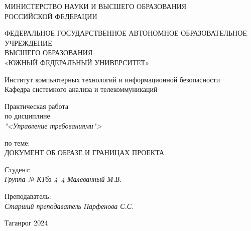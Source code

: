\thispagestyle{empty}

\begin{center}
    МИНИСТЕРСТВО НАУКИ И ВЫСШЕГО ОБРАЗОВАНИЯ \\ РОССИЙСКОЙ ФЕДЕРАЦИИ

    \vspace{20pt}

    ФЕДЕРАЛЬНОЕ ГОСУДАРСТВЕННОЕ АВТОНОМНОЕ ОБРАЗОВАТЕЛЬНОЕ УЧРЕЖДЕНИЕ \\
    ВЫСШЕГО ОБРАЗОВАНИЯ \\
    «ЮЖНЫЙ ФЕДЕРАЛЬНЫЙ УНИВЕРСИТЕТ»

    \vspace{20pt}

    Институт компьютерных технологий и информационной безопасности \\
    Кафедра системного анализа и телекоммуникаций
\end{center}

\vfill

\begin{center}
    Практическая работа \\
    по дисциплине \\
    \textit{"<Управление требованиями">}

    \vspace{20pt}

    по теме: \\
    \uppercase{Документ об образе и границах проекта}
\end{center}

\vfill

    \noindent Студент: \\
    \textit{Группа № КТбз 4--4 \hfill Малеванный М.В.}

    \vspace{20pt}

    \noindent Преподаватель: \\
    \textit{Старший преподаватель \hfill Парфенова С.С.}

\vfill

\begin{center}
    Таганрог 2024
\end{center}
